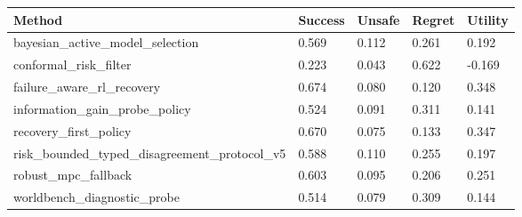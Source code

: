 \begin{tabular}{lllll}
\toprule
Method & Success & Unsafe & Regret & Utility \\
\midrule
bayesian\_active\_model\_selection & 0.569 & 0.112 & 0.261 & 0.192 \\
conformal\_risk\_filter & 0.223 & 0.043 & 0.622 & -0.169 \\
failure\_aware\_rl\_recovery & 0.674 & 0.080 & 0.120 & 0.348 \\
information\_gain\_probe\_policy & 0.524 & 0.091 & 0.311 & 0.141 \\
recovery\_first\_policy & 0.670 & 0.075 & 0.133 & 0.347 \\
risk\_bounded\_typed\_disagreement\_protocol\_v5 & 0.588 & 0.110 & 0.255 & 0.197 \\
robust\_mpc\_fallback & 0.603 & 0.095 & 0.206 & 0.251 \\
worldbench\_diagnostic\_probe & 0.514 & 0.079 & 0.309 & 0.144 \\
\bottomrule
\end{tabular}
